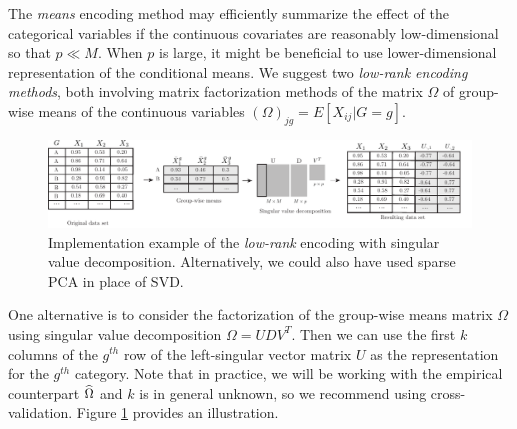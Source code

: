 \documentclass{article}
\theoremstyle{plain}
\theoremstyle{definition}
\theoremstyle{remark}
\begin{document}
The \emph{means} encoding method may efficiently summarize the effect of the categorical variables if the continuous covariates are reasonably low-dimensional so that $p \ll M$. When $p$ is large, it might be beneficial to use lower-dimensional representation of the conditional means. We suggest two  \emph{low-rank encoding methods}, both involving matrix factorization methods of the matrix $\Omega$ of group-wise means of the continuous variables $(\Omega)_{jg} = E[X_{ij} | G=g]$.
\begin{figure}[H]
  \centering
  \includegraphics[width=\textwidth]{figures/lowrank_encoding.pdf}
  \caption{Implementation example of the \emph{low-rank} encoding with singular value decomposition. Alternatively, we could also have used sparse PCA in place of SVD.}
  \label{fig:lowrank_encoding}
\end{figure}

One alternative is to consider the factorization of the group-wise means matrix $\Omega$ using singular value decomposition $\Omega = U D V^{T}$. Then we can use the first $k$ columns of the $g^{th}$ row of the left-singular vector matrix $U$ as the representation for the $g^{th}$ category. Note that in practice, we will be working with the empirical counterpart $\widehat{\Omega}$ and $k$ is in general unknown, so we recommend using cross-validation. Figure \ref{fig:lowrank_encoding} provides an illustration.
\end{document}
